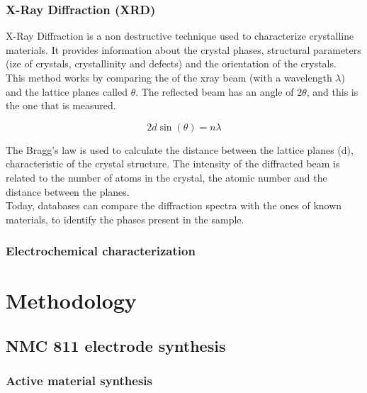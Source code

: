 \documentclass{article}
\begin{document}
{\subsubsection{X-Ray Diffraction (XRD)}
X-Ray Diffraction is a non destructive technique used to characterize crystalline materials. 
It provides information about the crystal phases, structural parameters (ize of crystals, crystallinity  and defects) and the orientation of the crystals.\\
This method works by comparing the of the xray beam (with a wavelength $\lambda$) and the lattice planes called $\theta$. The reflected beam has an angle of $2\theta$, and this is the one that is measured.


\begin{equation}
2d \sin(\theta) = n\lambda   
\end{equation}

The Bragg's law is used to calculate the distance between the lattice planes (d), characteristic of the crystal structure. 
The intensity of the diffracted beam is related to the number of atoms in the crystal, the atomic number and the distance between the planes.\\

Today, databases can compare the diffraction spectra with the ones of known materials, to identify the phases present in the sample.\\

\subsubsection{Electrochemical characterization}
 
\section {Methodology} 
\subsection{NMC 811 electrode synthesis}

\subsubsection{Active material synthesis}

}
\end{document}
